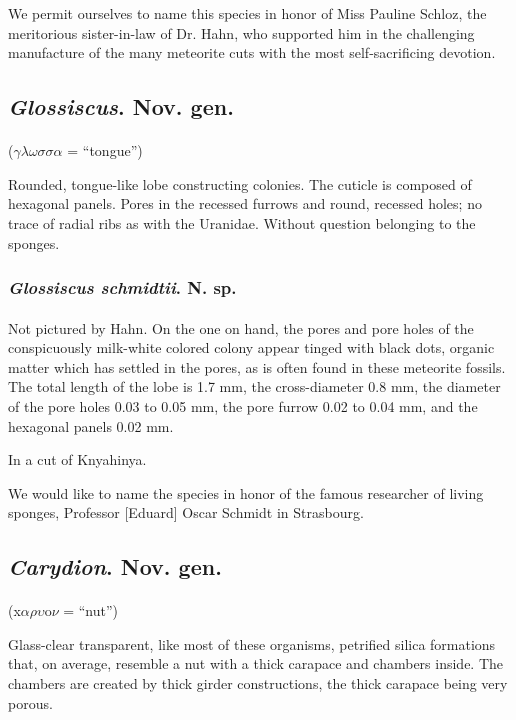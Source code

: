 \documentclass[a4paper, 12pt, oneside]{article}
\begin{document}
We permit ourselves to name this species in honor of Miss Pauline Schloz, the meritorious sister-in-law of Dr. Hahn, who supported him in the challenging manufacture of the many meteorite cuts with the most self-sacrificing devotion.
\subsection{\emph{Glossiscus}. Nov. gen.}
\paragraph{}
($\gamma\lambda\omega\sigma\sigma\alpha$ = ``tongue'')%

Rounded, tongue-like lobe constructing colonies. The cuticle is composed of hexagonal panels. Pores in the recessed furrows and round, recessed holes; no trace of radial ribs as with the Uranidae. Without question belonging to the sponges.
\subsubsection{\emph{Glossiscus schmidtii}. N. sp.}
\paragraph{}
Not pictured by Hahn. On the one on hand, the pores and pore holes of the conspicuously milk-white colored colony appear tinged with black dots, organic matter which has settled in the pores, as is often found in these meteorite fossils. The total length of the lobe is 1.7 mm, the cross-diameter 0.8 mm, the diameter of the pore holes 0.03 to 0.05 mm, the pore furrow 0.02 to 0.04 mm, and the hexagonal panels 0.02 mm.

In a cut of Knyahinya.

We would like to name the species in honor of the famous researcher of living sponges, Professor [Eduard] Oscar Schmidt in Strasbourg.
\subsection{\emph{Carydion}. Nov. gen.}
\paragraph{}
(x$\alpha\rho\upsilon$o$\nu$ = ``nut'')%

Glass-clear transparent, like most of these organisms, petrified silica formations that, on average, resemble a nut with a thick carapace and chambers inside. The chambers are created by thick girder constructions, the thick carapace being very porous.
\end{document}
